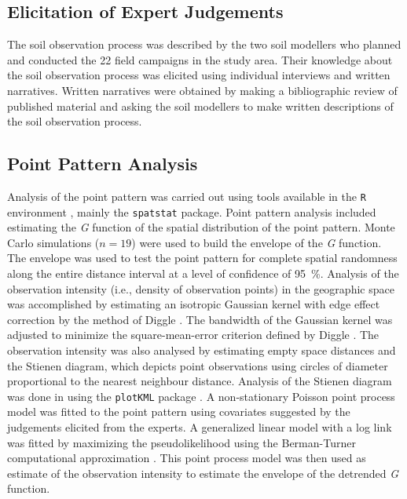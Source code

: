 \subsection{Elicitation of Expert Judgements}

The soil observation process was described by the two soil modellers who planned and conducted the 22 field 
campaigns in the study area. Their knowledge about the soil observation process was elicited using individual 
interviews and written narratives. Written narratives were obtained by making a bibliographic review of 
published 
material and asking the soil modellers to make written descriptions of the soil observation process.

\subsection{Point Pattern Analysis}

Analysis of the point pattern was carried out using tools available in the \texttt{R} environment 
\cite{R2013}, mainly the \texttt{spatstat} \cite{Baddeley2010} package. Point pattern analysis included 
estimating the \emph{G} function of the spatial distribution of the point pattern. Monte Carlo simulations ($n 
= 19$) were used to build the envelope of the \emph{G} function. The envelope was used to test the point 
pattern for complete spatial randomness along the entire distance interval at a level of confidence of 
\SI{95}{\percent}. Analysis of the observation intensity (i.e., density of observation points) in the 
geographic space was accomplished by estimating 
an isotropic Gaussian kernel with edge effect correction by the method of Diggle \cite{Diggle1985}. The 
bandwidth of the Gaussian kernel was adjusted to minimize the square-mean-error criterion defined by Diggle 
\cite{Diggle1985}. The observation intensity was also analysed by estimating empty space distances and the 
Stienen diagram, which depicts point observations using circles of diameter proportional to the nearest 
neighbour distance. Analysis of the Stienen diagram was done in \googleearth{} using the \texttt{plotKML} 
package \cite{Hengl2014}. A non-stationary Poisson point process model was fitted to the point pattern using 
covariates suggested by the judgements elicited from the experts. A generalized linear model with a log link 
was fitted by maximizing the pseudolikelihood using the Berman-Turner computational approximation 
\cite{Baddeley2010}. This point process model was then used as estimate of the observation intensity to 
estimate the envelope of the detrended \emph{G} function.

